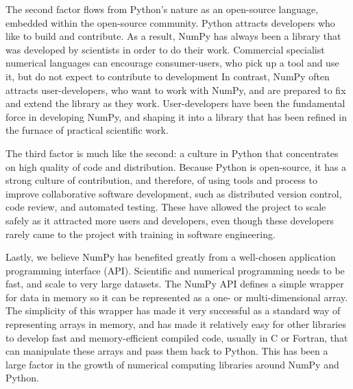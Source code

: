 The second factor flows from Python's nature as an open-source language,
embedded within the open-source community.  Python attracts developers who like
to build and contribute.  As a result, NumPy has always been a library that was
developed by scientists in order to do their work.  Commercial specialist
numerical languages can encourage consumer-users, who pick up a tool and use
it, but do not expect to contribute to development%
In contrast, NumPy often
attracts user-developers, who want to work with NumPy, and are prepared to fix
and extend the library as they work. User-developers have been the fundamental
force in developing NumPy, and shaping it into a library that has been refined
in the furnace of practical scientific work.

The third factor is much like the second: a culture in Python that concentrates
on high quality of code and distribution. Because Python is open-source, it has
a strong culture of contribution, and therefore, of using tools and process to
improve collaborative software development, such as distributed version
control, code review, and automated testing.  These have allowed the project to
scale safely as it attracted more users and developers, even though these
developers rarely came to the project with training in software engineering.

Lastly, we believe NumPy has benefited greatly from a well-chosen application
programming interface (API).  Scientific and numerical programming needs to be
fast, and scale to very large datasets.  The NumPy API defines a simple wrapper
for data in memory so it can be represented as a one- or multi-dimensional
array.  The simplicity of this wrapper has made it very successful as a
standard way of representing arrays in memory, and has made it relatively easy
for other libraries to develop fast and memory-efficient compiled code, usually
in C or Fortran, that can manipulate these arrays and pass them back to Python.
This has been a large factor in the growth of numerical computing libraries
around NumPy and Python.


%
%
%
%
%
%

